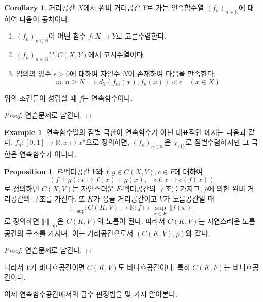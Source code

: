 \documentclass[11pt]{book}
\numberwithin{equation}{chapter}
\def\NN{\mathbb{N}}
\def\RR{\mathbb{R}}
\def\eps{\epsilon}
\newcommand{\norm}[1]{\left\Vert#1\right\Vert}
\theoremstyle{definition}
\newtheorem{cor}[thm]{Corollary}
\newtheorem{prop}[thm]{Proposition}
\newtheorem*{ex}{Example}
\newenvironment{enum}
	{\begin{enumerate}[label=(\alph*), leftmargin=2\parindent]}
	{\end{enumerate}}
\begin{document}
\begin{cor}
    거리공간 \(X\)에서 완비 거리공간 \(Y\)로 가는 연속함수열 \((f_n)_{n \in \NN}\)에 대하여 다음이 동치이다.
    \begin{enum}
        \item \((f_n)_{n \in \NN}\)이 어떤 함수 \(f : X \to Y\)로 고른수렴한다.
        \item \((f_n)_{n \in \NN}\)은 \(C(X, Y)\)에서 코시수열이다.
        \item 임의의 양수 \(\eps > 0\)에 대하여 자연수 \(N\)이 존재하여 다음을 만족한다.
        \[
        m, n \ge N \implies d_Y(f_m(x), f_n(x)) < \eps \quad (x \in X)    
        \]
    \end{enum}
    위의 조건들이 성립할 때 \(f\)는 연속함수이다.
\end{cor}
\begin{proof}
    연습문제로 남긴다.
\end{proof}

\begin{ex}
    연속함수열의 점별 극한이 연속함수가 아닌 대표적인 예시는 다음과 같다. \(f_n : [0, 1] \to \RR : x \mapsto x^n\)으로 정의하면, \((f_n)_{n \in \NN}\)은 \(\chi_{\{1\}}\)로 점별수렴하지만 그 극한은 연속함수가 아니다.
\end{ex}


\begin{prop}
    \(F\)-벡터공간 \(V\)와 \(f, g \in C(X, V), c \in F\)에 대하여
    \[
    (f+g) : x \mapsto f(x) + g(x), \quad cf : x \mapsto c(f(x))    
    \]
    로 정의하면 \(C(X, V)\)는 자연스러운 \(F\)-벡터공간의 구조를 가지고, \(\overline{\rho}\)에 의한 완비 거리공간의 구조를 가진다. 또 \(K\)가 옹골 거리공간이고 \(V\)가 노름공간일 때
    \[
    \norm{\cdot}_{\sup} : C(K, V) \to \RR : f \mapsto \sup_{x \in K} \norm{f(x)}
    \]
    로 정의하면 \(\norm{\cdot}_{\sup}\)은 \(C(K, V)\)의 노름이 된다. 따라서 \(C(K, V)\)는 자연스러운 노름공간의 구조를 가지며, 이는 거리공간으로서 \((C(K, V), \rho)\)와 같다.
\end{prop}
\begin{proof}
    연습문제로 남긴다.
\end{proof}

따라서 \(V\)가 바나흐공간이면 \(C(K, V)\)도 바나흐공간이다. 특히 \(C(K, F)\)는 바나흐공간이다.

이제 연속함수공간에서의 급수 판정법을 몇 가지 알아본다.
\end{document}
